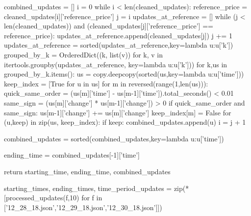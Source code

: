     combined_updates = []
    i = 0
    while i < len(cleaned_updates):
        reference_price = cleaned_updates[i]['reference_price']
        j = i
        updates_at_reference = []
        while (j < len(cleaned_updates)) and (cleaned_updates[j]['reference_price'] == reference_price):
            updates_at_reference.append(cleaned_updates[j])
            j += 1
        updates_at_reference = sorted(updates_at_reference,key=lambda u:u['k'])
        grouped_by_k = OrderedDict((k, list(v)) for k, v in itertools.groupby(updates_at_reference, key=lambda u:u['k']))
        for k,us in grouped_by_k.items():
            us = copy.deepcopy(sorted(us,key=lambda u:u['time']))
            keep_index = [True for u in us]
            for m in reversed(range(1,len(us))):
                quick_same_order = (us[m]['time'] - us[m-1]['time']).total_seconds() < 0.01
                same_sign = (us[m]['change'] * us[m-1]['change']) > 0
                if quick_same_order and same_sign:
                    us[m-1]['change'] += us[m]['change']
                    keep_index[m] = False
            for (u,keep) in zip(us, keep_index):
                if keep:
                    combined_updates.append(u)
        i = j + 1

    combined_updates = sorted(combined_updates,key=lambda u:u['time'])
    
    ending_time = combined_updates[-1]['time']
    
    return starting_time, ending_time, combined_updates

starting_times, ending_times, time_period_updates = zip(*[processed_updates(f,10) for f in ['12_28_18.json','12_29_18.json','12_30_18.json']])
